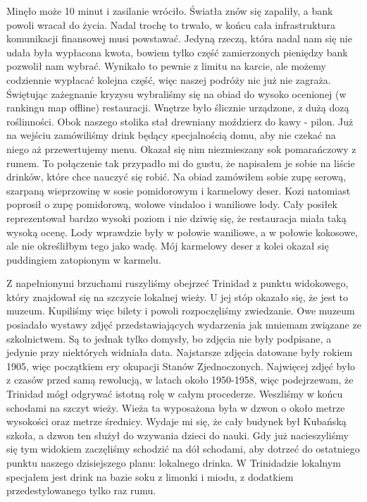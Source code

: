 Minęło może 10 minut i zasilanie wróciło.
Światła znów się zapaliły, a bank powoli wracał do życia.
Nadal trochę to trwało, w końcu cała infrastruktura komunikacji finansowej musi powstawać.
Jedyną rzeczą, która nadal nam się nie udała była wypłacona kwota, bowiem tylko część zamierzonych pieniędzy bank pozwolił nam wybrać. Wynikało to pewnie z limitu na karcie, ale możemy codziennie wypłacać kolejna część, więc naszej podróży nic już nie zagraża.
Świętując zażegnanie kryzysu wybraliśmy się na obiad do wysoko ocenionej (w rankingu map offline) restauracji.
Wnętrze było ślicznie urządzone, z dużą dozą roślinności.
Obok naszego stolika stał drewniany moździerz do kawy - pilon.
Już na wejściu zamówiliśmy drink będący specjalnością domu, aby nie czekać na niego aż przewertujemy menu.
Okazał się nim niezmieszany sok pomarańczowy z rumem.
To połączenie tak przypadło mi do gustu, że napisałem je sobie na liście drinków, które chce nauczyć się robić.
Na obiad zamówiłem sobie zupę serową, szarpaną wieprzowinę w sosie pomidorowym i karmelowy deser.
Kozi natomiast poprosił o zupę pomidorową, wołowe vindaloo i waniliowe lody.
Cały posiłek reprezentował bardzo wysoki poziom i nie dziwię się, że restauracja miała taką wysoką ocenę.
Lody wprawdzie były w połowie waniliowe, a w połowie kokosowe, ale nie określiłbym tego jako wadę.
Mój karmelowy deser z kolei okazał się puddingiem zatopionym w karmelu.
\par Z napełnionymi brzuchami ruszyliśmy obejrzeć Trinidad z punktu widokowego, który znajdował się na szczycie lokalnej wieży.
U jej stóp okazało się, że jest to muzeum.
Kupiliśmy więc bilety i powoli rozpoczęliśmy zwiedzanie.
Owe muzeum posiadało wystawy zdjęć przedstawiających wydarzenia jak mniemam związane ze szkolnictwem.
Są to jednak tylko domysły, bo zdjęcia nie były podpisane, a jedynie przy niektórych widniała data.
Najstarsze zdjęcia datowane były rokiem 1905, więc początkiem ery okupacji Stanów Zjednoczonych.
Najwięcej zdjęć było z czasów przed samą rewolucją, w latach około 1950-1958, więc podejrzewam, że Trinidad mógł odgrywać istotną rolę w całym procederze.
Weszliśmy w końcu schodami na szczyt wieży.
Wieża ta wyposażona była w dzwon o około metrze wysokości oraz metrze średnicy.
Wydaje mi się, że cały budynek był Kubańską szkoła, a dzwon ten służył do wzywania dzieci do nauki.
Gdy już nacieszyliśmy się tym widokiem zaczęliśmy schodzić na dół schodami, aby dotrzeć do ostatniego punktu naszego dzisiejszego planu: lokalnego drinka.
W Trinidadzie lokalnym specjałem jest drink na bazie soku z limonki i miodu, z dodatkiem przedestylowanego tylko raz rumu.
